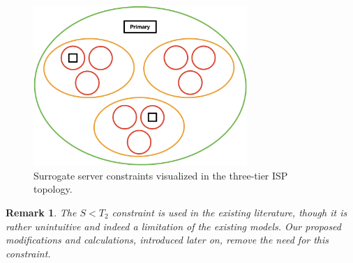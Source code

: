 \documentclass[
	a4paper, %
	10pt, %
	unnumberedsections, %
	twoside, %
]{LTJournalArticle}
\newtheorem*{remark}{Remark}
\begin{document}
\begin{figure}[h]
	\begin{center}
		\includegraphics[width=8.1cm]{bubble.jpeg}
	\end{center}
	\caption{Surrogate server constraints visualized in the three-tier ISP topology.}	
\end{figure}
\begin{remark}
The $S < T_2$ constraint is used in the existing literature, though it is rather unintuitive and indeed a limitation of the existing models. Our proposed modifications and calculations, introduced later on, remove the need for this constraint.
\end{remark}





	
\end{document}

